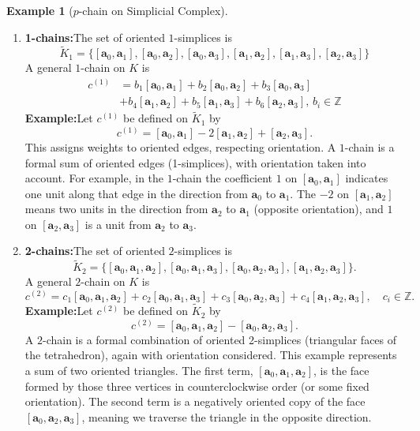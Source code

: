 \documentclass[12pt,oneside,reqno]{amsart}
\theoremstyle{plain}
\theoremstyle{definition}
\newtheorem{example}{Example}[section]
\theoremstyle{remark}
\newcommand{\0}{{\textbf{0}}}
\begin{document}
\begin{example}[$p$-chain on Simplicial Complex]
\begin{enumerate}
\item \textbf{1-chains:}The set of oriented $1$-simplices is
\[
\widetilde{K}_1 = \{ [\mathbf{a}_0,\mathbf{a}_1], [\mathbf{a}_0,\mathbf{a}_2], [\mathbf{a}_0,\mathbf{a}_3], [\mathbf{a}_1,\mathbf{a}_2], [\mathbf{a}_1,\mathbf{a}_3], [\mathbf{a}_2,\mathbf{a}_3] \}
\]
A general $1$-chain on $K$ is
\begin{align*}
c^{(1)} & =   b_1[\mathbf{a}_0,\mathbf{a}_1] + b_2[\mathbf{a}_0,\mathbf{a}_2] + b_3[\mathbf{a}_0,\mathbf{a}_3] \\
& + b_4[\mathbf{a}_1,\mathbf{a}_2] + b_5[\mathbf{a}_1,\mathbf{a}_3] + b_6[\mathbf{a}_2,\mathbf{a}_3], \, b_i \in \mathbb{Z}        
\end{align*}
\textbf{Example:}Let $c^{(1)}$ be defined on $\widetilde{K}_1$ by
\[
c^{(1)} = [\mathbf{a}_0,\mathbf{a}_1] - 2[\mathbf{a}_1,\mathbf{a}_2] + [\mathbf{a}_2,\mathbf{a}_3].
\]
This assigns weights to oriented edges, respecting orientation. A $1$-chain is a formal sum of oriented edges (1-simplices), with orientation taken into account. For example, in the $1$-chain the coefficient $1$ on $[\mathbf{a}_0,\mathbf{a}_1]$ indicates one unit along that edge in the direction from $\mathbf{a}_0$ to $\mathbf{a}_1$. The $-2$ on $[\mathbf{a}_1,\mathbf{a}_2]$ means two units in the direction from $\mathbf{a}_2$ to $\mathbf{a}_1$ (opposite orientation), and $1$ on $[\mathbf{a}_2,\mathbf{a}_3]$ is a unit from $\mathbf{a}_2$ to $\mathbf{a}_3$. 
\item \textbf{2-chains:}The set of oriented $2$-simplices is
\[
\widetilde{K}_2 = \{ [\mathbf{a}_0,\mathbf{a}_1,\mathbf{a}_2], [\mathbf{a}_0,\mathbf{a}_1,\mathbf{a}_3], [\mathbf{a}_0,\mathbf{a}_2,\mathbf{a}_3], [\mathbf{a}_1,\mathbf{a}_2,\mathbf{a}_3] \}.
\]
A general $2$-chain on $K$ is
\[
c^{(2)} = c_1[\mathbf{a}_0,\mathbf{a}_1,\mathbf{a}_2] + c_2[\mathbf{a}_0,\mathbf{a}_1,\mathbf{a}_3] + c_3[\mathbf{a}_0,\mathbf{a}_2,\mathbf{a}_3] + c_4[\mathbf{a}_1,\mathbf{a}_2,\mathbf{a}_3], \quad c_i \in \mathbb{Z}.
\]
\textbf{Example:}Let $c^{(2)}$ be defined on $\widetilde{K}_2$ by
\[
c^{(2)} = [\mathbf{a}_0,\mathbf{a}_1,\mathbf{a}_2] - [\mathbf{a}_0,\mathbf{a}_2,\mathbf{a}_3].
\]
A $2$-chain is a formal combination of oriented 2-simplices (triangular faces of the tetrahedron), again with orientation considered. This example represents a sum of two oriented triangles. The first term, $[\mathbf{a}_0,\mathbf{a}_1,\mathbf{a}_2]$, is the face formed by those three vertices in counterclockwise order (or some fixed orientation). The second term is a negatively oriented copy of the face $[\mathbf{a}_0,\mathbf{a}_2,\mathbf{a}_3]$, meaning we traverse the triangle in the opposite direction. 

\end{enumerate}
\end{example}
\end{document}
